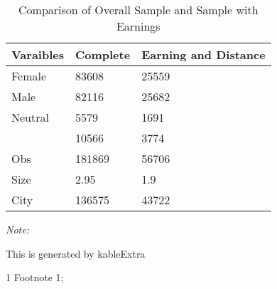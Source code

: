 \begin{table}
\centering
\caption{Comparison of Overall Sample and Sample with Earnings}
\centering
\begin{threeparttable}
\begin{tabular}[t]{lll}
\toprule
Varaibles & Complete & Earning and Distance\\
\midrule
Female & 83608 & 25559\\
Male & 82116 & 25682\\
Neutral & 5579 & 1691\\
 & 10566 & 3774\\
Obs & 181869 & 56706\\
\addlinespace
Size & 2.95 & 1.9\\
City & 136575 & 43722\\
\bottomrule
\end{tabular}
\begin{tablenotes}
\item \textit{Note: } 
\item This is generated by kableExtra
\item[1] Footnote 1; 
\end{tablenotes}
\end{threeparttable}
\end{table}
